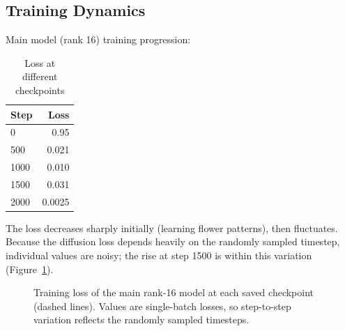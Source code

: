 \documentclass[11pt]{article}
\begin{document}
\subsection{Training Dynamics}

Main model (rank 16) training progression:

\begin{table}[!htbp]
\centering
\caption{Loss at different checkpoints}
\begin{tabular}{lr}
\toprule
Step & Loss \\
\midrule
0 & 0.95 \\
500 & 0.021 \\
1000 & 0.010 \\
1500 & 0.031 \\
2000 & 0.0025 \\
\bottomrule
\end{tabular}
\end{table}

The loss decreases sharply initially (learning flower patterns), then fluctuates. Because the diffusion loss depends heavily on the randomly sampled timestep, individual values are noisy; the rise at step 1500 is within this variation (Figure~\ref{fig:loss}).

\begin{figure}[!htbp]
\centering
{}
\caption{Training loss of the main rank-16 model at each saved checkpoint (dashed lines). Values are single-batch losses, so step-to-step variation reflects the randomly sampled timesteps.}
\label{fig:loss}
\end{figure}
\end{document}
